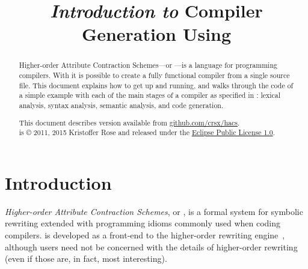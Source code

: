 \documentclass[11pt]{article} %
\title{
  \emph{Introduction to} Compiler Generation Using \HAX
}
\author{
  \authorname1{Kristoffer H. Rose}
  \authorinstitution1{Two Sigma Investments \also New York University}
}
\newcommand{\basecopyright}{%
  \HAX is © 2011, 2015 Kristoffer Rose and released under the
  \href{https://www.eclipse.org/legal/epl-v10.html}{Eclipse Public License 1.0}.}
\newcommand{\documentcopyright}{\basecopyright}
\begin{document}
\maketitle

\begin{abstract}\noindent
  Higher-order Attribute Contraction Schemes---or \HAX---is a language for programming compilers.
  With \HAX it is possible to create a fully functional compiler from a single source file.  This
  document explains how to get \HAX up and running, and walks through the code of a simple example
  with each of the main stages of a compiler as specified in \HAX: lexical analysis, syntax
  analysis, semantic analysis, and code generation.

  \compacttableofcontents

  \vspace*{2em} \color{gray}\noindent%
  This document describes \HAX version \version available from
  \href{http://github.com/crsx/hacs}{github.com/crsx/hacs}.\\[1ex]
  \documentcopyright
\end{abstract}


\section{Introduction}\label{sec:intro}

\emph{Higher-order Attribute Contraction Schemes}, or \HAX, is a formal system for symbolic
rewriting extended with programming idioms commonly used when coding compilers. \HAX is developed as
a front-end to the \CRSX higher-order rewriting engine~\cite{crsx}, although \HAX users need not be
concerned with the details of higher-order rewriting (even if those are, in fact, most interesting).
\end{document}
